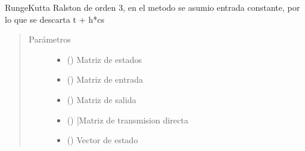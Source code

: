 \documentclass[letterpaper,10pt,spanish]{sphinxmanual}
\begin{document}
\begin{fulllineitems}
\label{\detokenize{codigos/rk_generator:rk_generator.ralston3}}
Runge\sphinxhyphen{}Kutta Ralston de orden 3, en el metodo se asumio entrada constante, por lo que se descarta t + h*cs
\begin{quote}\begin{description}
\item[{Parámetros}] \leavevmode\begin{itemize}
\item {} 
 (\sphinxstyleliteralemphasis{\sphinxupquote{, }}\sphinxstyleliteralemphasis{\sphinxupquote{, }}) \textendash{} Matriz de estados

\item {} 
 (\sphinxstyleliteralemphasis{\sphinxupquote{, }}\sphinxstyleliteralemphasis{\sphinxupquote{, }}) \textendash{} Matriz de entrada

\item {} 
 (\sphinxstyleliteralemphasis{\sphinxupquote{, }}\sphinxstyleliteralemphasis{\sphinxupquote{, }}) \textendash{} Matriz de salida

\item {} 
 (\sphinxstyleliteralemphasis{\sphinxupquote{, }}\sphinxstyleliteralemphasis{\sphinxupquote{, }}) \textendash{} {[}Matriz de transmision directa

\item {} 
 (\sphinxstyleliteralemphasis{\sphinxupquote{, }}\sphinxstyleliteralemphasis{\sphinxupquote{, }}) \textendash{} Vector de estado


\end{itemize}
\end{description}
\end{quote}
\end{fulllineitems}
\end{document}
